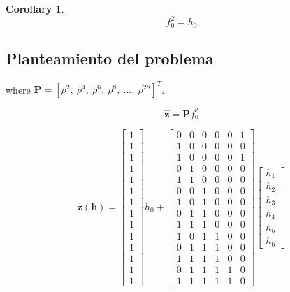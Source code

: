 \documentclass[journal]{IEEEtran}
\newtheorem{corollary}{Corollary}[theorem]
\begin{document}
\begin{corollary}

\begin{equation} 
 f_0^{2} = h_0
\end{equation}
 
\end{corollary}



\subsection{Planteamiento del problema}

where $\mathbf{P}=[\rho^2,~\rho^4,~\rho^6,~\rho^8,~...,~\rho^{28}]^T$.

\begin{equation}
\mathbf{\hat{z}}
=  
\mathbf{P} f_{0}^2
\end{equation}

\begin{equation}
\mathbf{z}(\mathbf{h})
=  
\begin{bmatrix}
1 \\ 
1 \\ 
1 \\ 
1 \\ 
1 \\ 
1 \\ 
1 \\
1 \\ 
1 \\ 
1 \\ 
1 \\ 
1 \\ 
1 \\ 
1
\end{bmatrix}
h_{0} + 
\begin{bmatrix}
0 & 0 & 0 & 0 & 0 & 1 \\
1 & 0 & 0 & 0 & 0 & 0 \\
1 & 0 & 0 & 0 & 0 & 1 \\
0 & 1 & 0 & 0 & 0 & 0 \\ 
1 & 1 & 0 & 0 & 0 & 0 \\ 
0 & 0 & 1 & 0 & 0 & 0 \\
1 & 0 & 1 & 0 & 0 & 0 \\ 
0 & 1 & 1 & 0 & 0 & 0 \\ 
1 & 1 & 1 & 0 & 0 & 0 \\ 
1 & 0 & 1 & 1 & 0 & 0 \\ 
0 & 1 & 1 & 1 & 0 & 0 \\ 
1 & 1 & 1 & 1 & 0 & 0 \\
0 & 1 & 1 & 1 & 1 & 0 \\
1 & 1 & 1 & 1 & 1 & 0 
\end{bmatrix} 
\begin{bmatrix}
h_{1} \\
h_{2} \\
h_{3} \\
h_{4} \\
h_{5} \\
h_{6}
\end{bmatrix} 
\end{equation}
\end{document}

